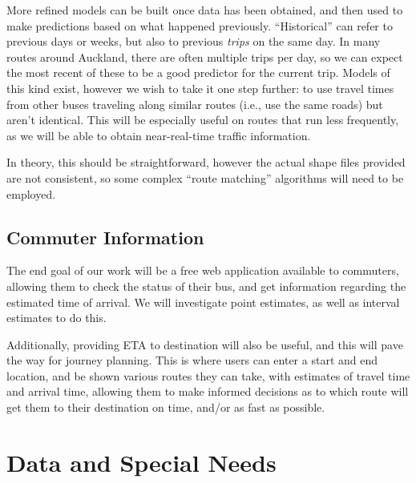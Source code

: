 \documentclass[12pt,a4paper]{article}
\begin{document}
More refined models can be built once data has been obtained, 
and then used to make predictions based on what happened previously.
``Historical'' can refer to previous days or weeks,
but also to previous \emph{trips} on the same day.
In many routes around Auckland, there are often multiple trips per day,
so we can expect the most recent of these to be a good predictor for the current trip.
Models of this kind exist, however we wish to take it one step further:
to use travel times from other buses traveling along similar routes
(i.e., use the same roads) but aren't identical.
This will be especially useful on routes that run less frequently,
as we will be able to obtain near-real-time traffic information.


In theory, this should be straightforward,
however the actual shape files provided are not consistent, so some complex ``route matching''
algorithms will need to be employed.



\subsection{Commuter Information}
\label{sec:commuter-info}


The end goal of our work will be a free web application available to
commuters, allowing them to check the status of their bus,
and get information regarding the estimated time of arrival.
We will investigate point estimates, as well as interval estimates to do this.


Additionally, providing ETA to destination will also be useful,
and this will pave the way for journey planning.
This is where users can enter a start and end location,
and be shown various routes they can take,
with estimates of travel time and arrival time,
allowing them to make informed decisions as to which route will get them
to their destination on time, and/or as fast as possible.









\section{Data and Special Needs}
\label{sec:data}


\end{document}
